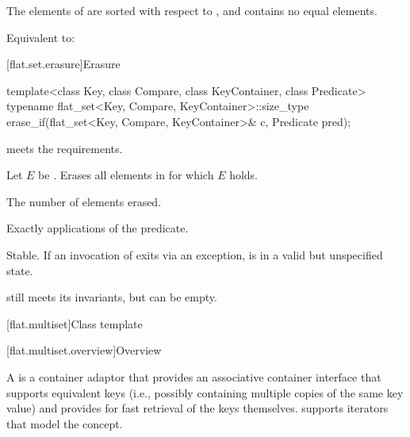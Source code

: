 \begin{itemdescr}
\pnum
\expects
The elements of  are sorted with respect to , and
 contains no equal elements.

\pnum
\effects
Equivalent to: 
\end{itemdescr}

[flat.set.erasure]{Erasure}

%
\begin{itemdecl}
template<class Key, class Compare, class KeyContainer, class Predicate>
  typename flat_set<Key, Compare, KeyContainer>::size_type
    erase_if(flat_set<Key, Compare, KeyContainer>& c, Predicate pred);
\end{itemdecl}

\begin{itemdescr}
\pnum
\expects
{} meets the  requirements.

\pnum
\effects
Let $E$ be .
Erases all elements  in  for which $E$ holds.

\pnum
\returns
The number of elements erased.

\pnum
\complexity
Exactly  applications of the predicate.

\pnum
\remarks
Stable.
If an invocation of  exits via an exception,
 is in a valid but unspecified state.
\begin{note}
 still meets its invariants, but can be empty.
\end{note}
\end{itemdescr}

[flat.multiset]{Class template }

[flat.multiset.overview]{Overview}

\pnum
{}%
A  is a container adaptor
that provides an associative container interface
that supports equivalent keys
(i.e., possibly containing multiple copies of the same key value) and
provides for fast retrieval of the keys themselves.
 supports iterators that model the
 concept.

